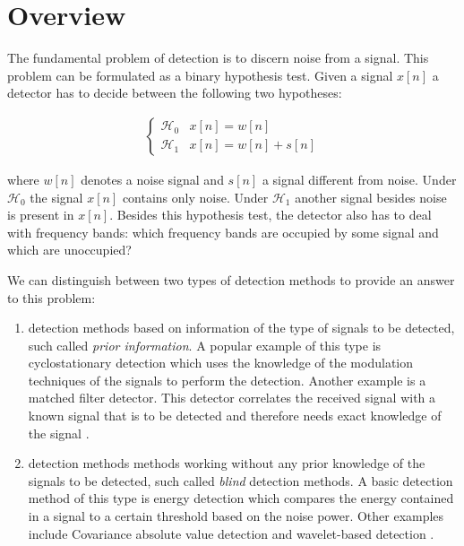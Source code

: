 \documentclass[a4paper, openany, oneside]{memoir}
\begin{document}
\section{Overview}

The fundamental problem of detection is to discern noise from a signal. This problem can be formulated as a binary hypothesis test. Given a signal $x[n]$ a detector has to decide between the following two hypotheses:

\begin{align*}
	\begin{cases}
		\mathcal{H}_0 & x[n] = w[n] \\
		\mathcal{H}_1 & x[n] = w[n] + s[n]
	\end{cases}
\end{align*}

where $w[n]$ denotes a noise signal and $s[n]$ a signal different from noise. Under $\mathcal{H}_0$ the signal $x[n]$ contains only noise. Under $\mathcal{H}_1$ another signal besides noise is present in $x[n]$. Besides this hypothesis test, the detector also has to deal with frequency bands: which frequency bands are occupied by some signal and which are unoccupied?

We can distinguish between two types of detection methods to provide an answer to this problem:
\begin{enumerate}
\item detection methods based on information of the type of signals to be detected, such called \emph{prior information}.
A popular example of this type is cyclostationary detection which uses the knowledge of the modulation techniques of the signals to perform the detection\cite{axell2012spectrum,quan2009optimal}. Another example is a matched filter detector. This detector correlates the received signal with a known signal that is to be detected and therefore needs exact knowledge of the signal \cite{Kapoor2011Communication}\cite{couch2013digital}. 
\item detection methods methods working without any prior knowledge of the signals to be detected, such called \emph{blind} detection methods.
A basic detection method of this type is energy detection \cite{axell2012spectrum} which compares the energy contained in a signal to a certain threshold based on the noise power. Other examples include Covariance absolute value detection \cite{zheng2009spectrum} and wavelet-based detection \cite{han2013novel}. 
\end{enumerate}
\end{document}
